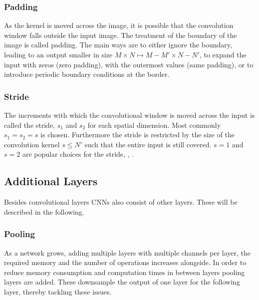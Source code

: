 %
%
%


\subsubsection{Padding}
As the kernel is moved across the image, it is possible that the convolution window falls outside the input image. The treatment of the boundary of the image is called padding. The main ways are to either ignore the boundary, leading to an output smaller in size $M\times N \mapsto M-M' \times N-N'$, to expand the input with zeros (zero padding), with the outermost values (same padding), or to introduce periodic boundary conditions at the border.

\subsubsection{Stride}
The increments with which the convolutional window is moved across the input is called the stride, $s_1$ and $s_2$ for each spatial dimension. Most commonly $s_1 = s_2 = s$ is chosen. Furthermore the stride is restricted by the size of the convolution kernel $s\leq N'$ such that the entire input is still covered. $s=1$ and $s=2$ are popular choices for the stride, \cite{Szegedy2015}, \cite{He2015a}.

\subsection{Additional Layers}
Besides convolutional layers CNNs also consist of other layers. These will be described in the following.

\subsubsection{Pooling}
As a network grows, adding multiple layers with multiple channels per layer, the required memory and the number of operations increases alongside. In order to reduce memory consumption and computation times in between layers pooling layers are added. These downsample the output of one layer for the following layer, thereby tackling these issues.\\

